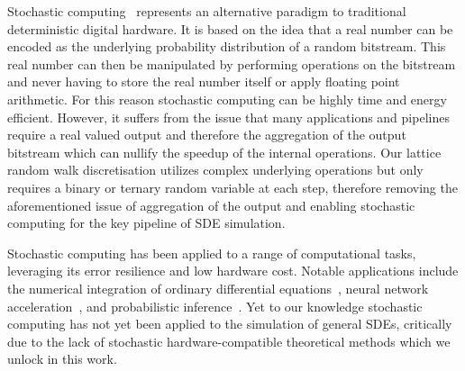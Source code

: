 \documentclass[pra,showpacs,amsmath,amssymb,amsfonts,lengthcheck,longbibliography,onecolumn]{revtex4-2}
\newcommand{\samd}[1]{{\color[RGB]{250, 0, 250}{SD: #1}}}
\newcommand{\pj}[1]{{\color[RGB]{200, 100, 0}{PJC: #1}}}
\begin{document}




Stochastic computing~\cite{gaines1967stochastic, alaghi2013survey, gross2019stochastic}
represents an alternative paradigm to traditional deterministic digital
hardware. It is based on the idea that a real number can be encoded as the underlying
probability distribution of a random bitstream. This real number can then be manipulated
by performing operations on the bitstream and never having to store the real number itself
or apply floating point arithmetic. For this reason stochastic computing can be highly
time and energy efficient. However, it suffers from the issue that many applications
and pipelines require a real valued output and therefore the aggregation of the output
bitstream which can nullify the speedup of the internal operations. Our lattice random walk
discretisation utilizes complex underlying operations but only requires a binary or ternary
random variable at each step, therefore removing the aforementioned issue of aggregation
of the output and enabling stochastic computing for the key pipeline of SDE simulation.


Stochastic computing has been applied to a range of computational tasks, leveraging its
error resilience and low hardware cost. Notable applications include the numerical integration
of ordinary differential equations~\cite{liu2017hardware, camps2021stochastic},
neural network acceleration~\cite{alaghi2013survey,li2017towards}, and probabilistic
inference~\cite{gaines1967stochastic}. Yet to our knowledge stochastic computing has not
yet been applied to the simulation of general SDEs, critically due to the lack of
stochastic hardware-compatible theoretical methods which we unlock in this work.
\end{document}
